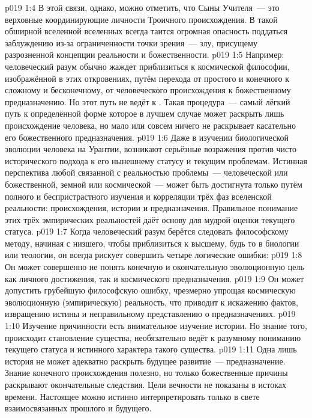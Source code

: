 \vs p019 1:4 В этой связи, однако, можно отметить, что Сыны Учителя~--- это верховные координирующие личности Троичного происхождения. В такой обширной вселенной вселенных всегда таится огромная опасность поддаться заблуждению из-за ограниченности точки зрения~--- злу, присущему разрозненной концепции реальности и божественности.
\vs p019 1:5 Например: человеческий разум обычно жаждет приблизиться к космической философии, изображённой в этих откровениях, путём перехода от простого и конечного к сложному и бесконечному, от человеческого происхождения к божественному предназначению. Но этот путь не ведёт к . Такая процедура~--- самый лёгкий путь к определённой форме  которое в лучшем случае может раскрыть лишь происхождение человека, но мало или совсем ничего не раскрывает касательно его божественного предназначения.
\vs p019 1:6 Даже в изучении биологической эволюции человека на Урантии, возникают серьёзные возражения против чисто исторического подхода к его нынешнему статусу и текущим проблемам. Истинная перспектива любой связанной с реальностью проблемы~--- человеческой или божественной, земной или космической~--- может быть достигнута только путём полного и беспристрастного изучения и корреляции трёх фаз вселенской реальности: происхождения, истории и предназначения. Правильное понимание этих трёх эмпирических реальностей даёт основу для мудрой оценки текущего статуса.
\vs p019 1:7 \pc Когда человеческий разум берётся следовать философскому методу, начиная с низшего, чтобы приблизиться к высшему, будь то в биологии или теологии, он всегда рискует совершить четыре логические ошибки:
\vs p019 1:8 Он может совершенно не понять конечную и окончательную эволюционную цель как личного достижения, так и космического предназначения.
\vs p019 1:9 Он может допустить грубейшую философскую ошибку, чрезмерно упрощая космическую эволюционную (эмпирическую) реальность, что приводит к искажению фактов, извращению истины и неправильному представлению о предназначениях.
\vs p019 1:10 Изучение причинности есть внимательное изучение истории. Но знание того,  происходит становление существа, необязательно ведёт к разумному пониманию текущего статуса и истинного характера такого существа.
\vs p019 1:11 Одна лишь история не может адекватно раскрыть будущее развитие~--- предназначение. Знание конечного происхождения полезно, но только божественные причины раскрывают окончательные следствия. Цели вечности не показаны в истоках времени. Настоящее можно истинно интерпретировать только в свете взаимосвязанных прошлого и будущего.

